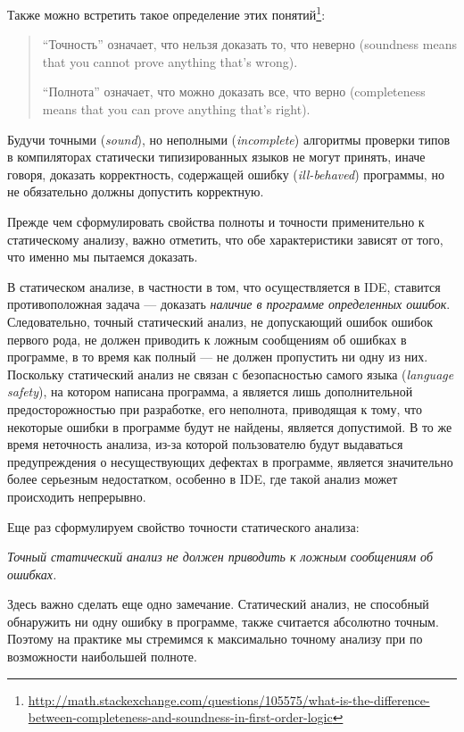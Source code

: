 Также можно встретить такое определение этих
понятий\footnote{\url{http://math.stackexchange.com/questions/105575/what-is-the-difference-between-completeness-and-soundness-in-first-order-logic}}:

\begin{quote}
``Точность'' означает, что нельзя доказать то, что неверно (soundness means that
you cannot prove anything that's wrong).

``Полнота'' означает, что можно доказать все, что верно (completeness means that
you can prove anything that's right).
\end{quote}

Будучи точными (\emph{sound}), но неполными (\emph{incomplete}) алгоритмы
проверки типов в компиляторах статически типизированных языков не
могут принять, иначе говоря, доказать корректность, содержащей ошибку (\emph{ill-behaved})
программы, но не обязательно должны допустить корректную.

Прежде чем сформулировать свойства полноты и точности применительно к
статическому анализу, важно отметить, что обе характеристики зависят от того,
что именно мы пытаемся доказать.

В статическом анализе, в частности в том, что осуществляется в IDE, ставится
противоположная задача --- доказать \emph{наличие в программе определенных
  ошибок}.  Следовательно, точный статический анализ, не допускающий ошибок
ошибок первого рода, не должен приводить к ложным сообщениям об ошибках в программе, в
то время как полный --- не должен пропустить ни одну из них. Поскольку
статический анализ не связан с безопасностью самого языка (\emph{language
  safety}), на котором написана программа, а является лишь дополнительной
предосторожностью при разработке, его неполнота, приводящая к тому, что
некоторые ошибки в программе будут не найдены, является допустимой. В то же
время неточность анализа, из-за которой пользователю будут выдаваться
предупреждения о несуществующих дефектах в программе, является значительно более
серьезным недостатком, особенно в IDE, где такой анализ может происходить
непрерывно.

Еще раз сформулируем свойство точности статического анализа:

\emph{Точный статический анализ не должен приводить к ложным сообщениям об 
ошибках.}

Здесь важно сделать еще одно замечание. Статический анализ, не способный
обнаружить ни одну ошибку в программе, также считается абсолютно точным. Поэтому
на практике мы стремимся к максимально точному анализу при по возможности
наибольшей полноте.

